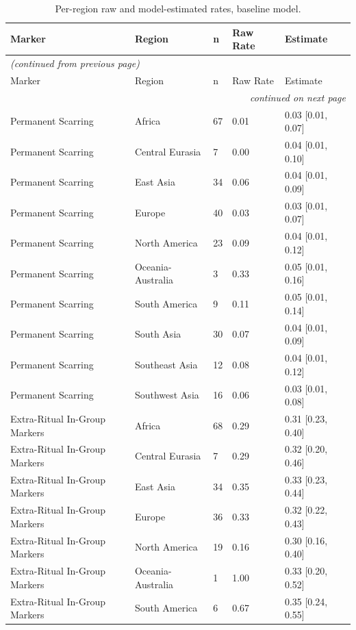 \small
\begin{longtable}{lllll}
\caption{Per-region raw and model-estimated rates, baseline model.} \label{tab:int_region_effects_baseline} \\
\toprule
Marker & Region & n & Raw Rate & Estimate \\
\midrule
\endfirsthead
\multicolumn{5}{l}{\small\itshape (continued from previous page)} \\
\toprule
Marker & Region & n & Raw Rate & Estimate \\
\midrule
\endhead
\midrule
\multicolumn{5}{r}{\small\itshape continued on next page} \\
\endfoot
\bottomrule
\endlastfoot
Permanent Scarring & Africa & 67 & 0.01 & 0.03 [0.01, 0.07] \\
Permanent Scarring & Central Eurasia & 7 & 0.00 & 0.04 [0.01, 0.10] \\
Permanent Scarring & East Asia & 34 & 0.06 & 0.04 [0.01, 0.09] \\
Permanent Scarring & Europe & 40 & 0.03 & 0.03 [0.01, 0.07] \\
Permanent Scarring & North America & 23 & 0.09 & 0.04 [0.01, 0.12] \\
Permanent Scarring & Oceania-Australia & 3 & 0.33 & 0.05 [0.01, 0.16] \\
Permanent Scarring & South America & 9 & 0.11 & 0.05 [0.01, 0.14] \\
Permanent Scarring & South Asia & 30 & 0.07 & 0.04 [0.01, 0.09] \\
Permanent Scarring & Southeast Asia & 12 & 0.08 & 0.04 [0.01, 0.12] \\
Permanent Scarring & Southwest Asia & 16 & 0.06 & 0.03 [0.01, 0.08] \\
Extra-Ritual In-Group Markers & Africa & 68 & 0.29 & 0.31 [0.23, 0.40] \\
Extra-Ritual In-Group Markers & Central Eurasia & 7 & 0.29 & 0.32 [0.20, 0.46] \\
Extra-Ritual In-Group Markers & East Asia & 34 & 0.35 & 0.33 [0.23, 0.44] \\
Extra-Ritual In-Group Markers & Europe & 36 & 0.33 & 0.32 [0.22, 0.43] \\
Extra-Ritual In-Group Markers & North America & 19 & 0.16 & 0.30 [0.16, 0.40] \\
Extra-Ritual In-Group Markers & Oceania-Australia & 1 & 1.00 & 0.33 [0.20, 0.52] \\
Extra-Ritual In-Group Markers & South America & 6 & 0.67 & 0.35 [0.24, 0.55] \\

\end{longtable}
